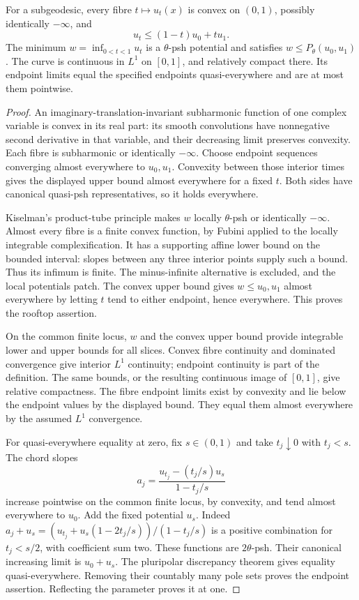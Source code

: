 \begin{proposition}\label{prop:subgeodesic-convexity-and-continuity}
For a subgeodesic, every fibre $t\mapsto u_t(x)$ is convex on $(0,1)$, possibly identically $-\infty$, and
\[
 u_t\leq(1-t)u_0+tu_1.
\]
The minimum $w=\inf_{0<t<1}u_t$ is a $\theta$-psh potential and satisfies $w\leq P_\theta(u_0,u_1)$. The curve is continuous in $L^1$ on $[0,1]$, and relatively compact there. Its endpoint limits equal the specified endpoints quasi-everywhere and are at most them pointwise.
\end{proposition}
\begin{proof}
An imaginary-translation-invariant subharmonic function of one complex variable is convex in its real part: its smooth convolutions have nonnegative second derivative in that variable, and their decreasing limit preserves convexity. Each fibre is subharmonic or identically $-\infty$. Choose endpoint sequences converging almost everywhere to $u_0,u_1$. Convexity between those interior times gives the displayed upper bound almost everywhere for a fixed $t$. Both sides have canonical quasi-psh representatives, so it holds everywhere.

Kiselman's product-tube principle makes $w$ locally $\theta$-psh or identically $-\infty$. Almost every fibre is a finite convex function, by Fubini applied to the locally integrable complexification. It has a supporting affine lower bound on the bounded interval: slopes between any three interior points supply such a bound. Thus its infimum is finite. The minus-infinite alternative is excluded, and the local potentials patch. The convex upper bound gives $w\leq u_0,u_1$ almost everywhere by letting $t$ tend to either endpoint, hence everywhere. This proves the rooftop assertion.

On the common finite locus, $w$ and the convex upper bound provide integrable lower and upper bounds for all slices. Convex fibre continuity and dominated convergence give interior $L^1$ continuity; endpoint continuity is part of the definition. The same bounds, or the resulting continuous image of $[0,1]$, give relative compactness. The fibre endpoint limits exist by convexity and lie below the endpoint values by the displayed bound. They equal them almost everywhere by the assumed $L^1$ convergence.

For quasi-everywhere equality at zero, fix $s\in(0,1)$ and take $t_j\downarrow0$ with $t_j<s$. The chord slopes
\[
 a_j=\frac{u_{t_j}-(t_j/s)u_s}{1-t_j/s}
\]
increase pointwise on the common finite locus, by convexity, and tend almost everywhere to $u_0$. Add the fixed potential $u_s$. Indeed
$a_j+u_s=(u_{t_j}+u_s(1-2t_j/s))/(1-t_j/s)$ is a positive combination for $t_j<s/2$, with coefficient sum two. These functions are $2\theta$-psh. Their canonical increasing limit is $u_0+u_s$. The pluripolar discrepancy theorem gives equality quasi-everywhere. Removing their countably many pole sets proves the endpoint assertion. Reflecting the parameter proves it at one.
\end{proof}

